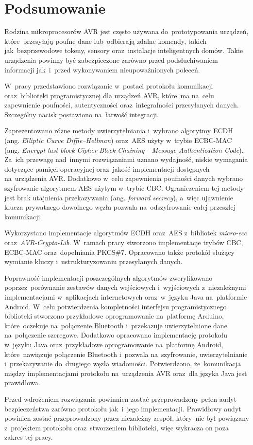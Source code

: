 \chapter*{Podsumowanie}
\label{cha:podsumowanie}

Rodzina mikroprocesorów AVR jest często używana do~prototypowania urządzeń, które~przesyłają poufne dane lub~odbierają zdalne komendy, takich jak~bezprzewodowe tokeny, sensory oraz~instalacje inteligentnych domów. Takie urządzenia powinny być zabezpieczone zarówno przed podsłuchiwaniem informacji jak~i~przed wykonywaniem nieupoważnionych poleceń.

W~pracy przedstawiono rozwiązanie w~postaci protokołu komunikacji oraz~biblioteki programistycznej dla urządzeń AVR, które~ma na~celu zapewnienie poufności, autentyczności oraz~integralności przesyłanych danych. Szczególny nacisk postawiono na~łatwość integracji.

Zaprezentowano różne metody uwierzytelniania i~wybrano algorytmy ECDH (ang. \emph{Elliptic Curve Diffie--Hellman}) oraz~AES użyty w~trybie ECBC-MAC (ang. \emph{Encrypt-last-block Cipher Block Chaining - Message Authentication Code}). Za~ich przewagę nad~innymi rozwiązaniami uznano wydajność, niskie wymagania dotyczące pamięci operacyjnej oraz~jakość implementacji dostępnych na~urządzenia AVR. Dodatkowo w~celu zapewnienia poufności danych wybrano szyfrowanie algorytmem AES użytym w~trybie CBC. Ograniczeniem tej metody jest brak utajnienia przekazywania (ang. \emph{forward secrecy}), a~więc ujawnienie klucza prywatnego dowolnego węzła pozwala na~odszyfrowanie całej przeszłej komunikacji.

Wykorzystano implementacje algorytmów ECDH oraz~AES z~bibliotek \emph{micro-ecc} oraz~\emph{AVR-Crypto-Lib}. W~ramach pracy stworzono implementacje trybów CBC, ECBC-MAC oraz~dopełniania PKCS\#7. Opracowano także protokół służący wymianie kluczy i~ustrukturyzowaniu przesyłanych danych.

Poprawność implementacji poszczególnych algorytmów zweryfikowano poprzez~porównanie zestawów danych wejściowych i~wyjściowych z~niezależnymi implementacjami w~aplikacjach internetowych oraz~w~języku Java na~platformie Android. W~celu potwierdzenia kompletności interfejsu programistycznego biblioteki stworzono przykładowe oprogramowanie na~platformę Arduino, które~oczekuje na~połączenie Bluetooth i~przekazuje uwierzytelnione dane na~połączenie szeregowe. Dodatkowo opracowano implementację protokołu w~języku Java oraz~przykładowe oprogramowanie na~platformę Android, które~nawiązuje połączenie Bluetooth i~pozwala na~szyfrowanie, uwierzytelnianie i~przekazywanie do~drugiego węzła wiadomości. Potwierdzono, że~komunikacja między implementacjami protokołu na~urządzenia AVR oraz~dla języka Java jest prawidłowa.

Przed wdrożeniem rozwiązania powinnien zostać przeprowadzony pełen audyt bezpieczeństwa zarówno protokołu jak~i~jego implementacji. Prawidłowy audyt powinien zostać przeprowadzony przez niezależny zespół, który~nie był powiązany z~projektem protokołu oraz~stworzeniem biblioteki, więc wykracza on poza zakres tej pracy.
